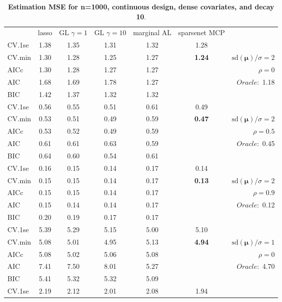 \begin{table}\vspace{-.5cm}
\caption[l]{ { \bf Estimation MSE for n=1000, continuous design, 
dense covariates, and  decay  10}.}
\vspace{-.5cm}
\footnotesize{}
\begin{center}
\begin{tabular}{l*{5}{c}|r}
& lasso & GL $\gamma=1$ & GL $\gamma=10$ & marginal AL & sparsenet MCP  & \\
 \cline{1-7}
CV.1se & 1.38 & 1.35 & 1.31 & 1.32 & 1.28 & \\
CV.min & 1.30 & 1.28 & 1.25 & 1.27 & {\bf 1.24} &  $\mathrm{sd}(\mathbf{\mu})/\sigma=2$ \\
AICc & 1.30 & 1.28 & 1.27 & 1.27 & & $\rho=0$ \\
AIC & 1.68 & 1.69 & 1.78 & 1.27 & &  \multirow{2}{*}{$Oracle: $ 1.18} \\
BIC & 1.42 & 1.37 & 1.32 & 1.32 & &  \\
 \hline 
CV.1se & 0.56 & 0.55 & 0.51 & 0.61 & 0.49 & \\
CV.min & 0.53 & 0.51 & 0.49 & 0.59 & {\bf 0.47} &  $\mathrm{sd}(\mathbf{\mu})/\sigma=2$ \\
AICc & 0.53 & 0.52 & 0.49 & 0.59 & & $\rho=0.5$ \\
AIC & 0.61 & 0.61 & 0.63 & 0.59 & &  \multirow{2}{*}{$Oracle: $ 0.45} \\
BIC & 0.64 & 0.60 & 0.54 & 0.61 & &  \\
 \hline 
CV.1se & 0.16 & 0.15 & 0.14 & 0.17 & 0.14 & \\
CV.min & 0.15 & 0.15 & 0.14 & 0.17 & {\bf 0.13} &  $\mathrm{sd}(\mathbf{\mu})/\sigma=2$ \\
AICc & 0.15 & 0.15 & 0.14 & 0.17 & & $\rho=0.9$ \\
AIC & 0.15 & 0.14 & 0.14 & 0.17 & &  \multirow{2}{*}{$Oracle: $ 0.12} \\
BIC & 0.20 & 0.19 & 0.17 & 0.17 & &  \\
 \hline 
CV.1se & 5.39 & 5.29 & 5.15 & 5.00 & 5.10 & \\
CV.min & 5.08 & 5.01 & 4.95 & 5.13 & {\bf 4.94} &  $\mathrm{sd}(\mathbf{\mu})/\sigma=1$ \\
AICc & 5.08 & 5.02 & 5.06 & 5.08 & & $\rho=0$ \\
AIC & 7.41 & 7.50 & 8.01 & 5.27 & &  \multirow{2}{*}{$Oracle: $ 4.70} \\
BIC & 5.41 & 5.32 & 5.32 & 5.09 & &  \\
 \hline 
CV.1se & 2.19 & 2.12 & 2.01 & 2.08 & 1.94 & \\

\end{tabular}
\end{center}
\end{table}
